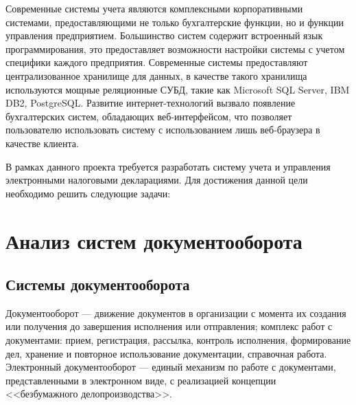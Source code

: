 \documentclass[14pt,a4paper]{reportmod}
\begin{document}
Современные системы учета являются комплексными корпоративными системами, предоставляющими не только бухгалтерские функции, но и функции управления предприятием. Большинство систем содержит встроенный язык программирования, это предоставляет возможности настройки системы с учетом специфики каждого предприятия. Современные системы предоставляют централизованное хранилище для данных, в качестве такого хранилища используются мощные реляционные СУБД, такие как Microsoft SQL Server, IBM DB2, PostgreSQL. Развитие интернет-технологий вызвало появление бухгалтерских систем, обладающих веб-интерфейсом, что позволяет пользователю использовать систему с использованием лишь веб-браузера в качестве клиента.

В рамках данного проекта требуется разработать систему учета и управления электронными налоговыми декларациями. Для достижения данной цели необходимо решить следующие задачи:
\begin{gostitemize}
\end{gostitemize}

\chapter{Анализ систем документооборота}

\section{Системы документооборота}
Документооборот — движение документов в организации с момента их создания или получения до завершения исполнения или отправления; комплекс работ с документами: прием, регистрация, рассылка, контроль исполнения, формирование дел, хранение и повторное использование документации, справочная работа.
Электронный документооборот  — единый механизм по работе с документами, представленными в электронном виде, с реализацией концепции <<безбумажного делопроизводства>>\cite{refwikidoc}.
\end{document}
